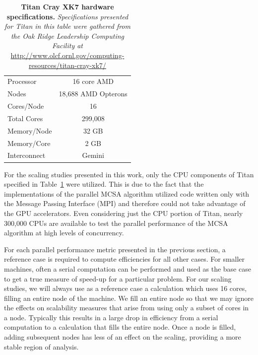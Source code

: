 \begin{table}[h!]
  \begin{center}
    \begin{tabular}{lc}\hline\hline
      Processor & 16 core AMD \\
      Nodes & 18,688 AMD Opterons \\
      Cores/Node & 16 \\
      Total Cores & 299,008 \\
      Memory/Node & 32 GB \\
      Memory/Core & 2 GB \\
      Interconnect & Gemini \\
      \hline\hline
    \end{tabular}
  \end{center}
  \caption{\textbf{Titan Cray XK7 hardware specifications.}
    \textit{Specifications presented for Titan in this table were
      gathered from the Oak Ridge Leadership Computing Facility at}
    \url{http://www.olcf.ornl.gov/computing-resources/titan-cray-xk7/}}
  \label{tab:titan_hardware}
\end{table}

For the scaling studies presented in this work, only the CPU
components of Titan specified in Table~\ref{tab:titan_hardware} were
utilized. This is due to the fact that the implementations of the
parallel MCSA algorithm utilized code written only with the Message
Passing Interface (MPI) and therefore could not take advantage of the
GPU accelerators. Even considering just the CPU portion of Titan,
nearly 300,000 CPUs are available to test the parallel performance of
the MCSA algorithm at high levels of concurrency.

For each parallel performance metric presented in the previous
section, a reference case is required to compute efficiencies for all
other cases. For smaller machines, often a serial computation can be
performed and used as the base case to get a true measure of speed-up
for a particular problem. For our scaling studies, we will always use
as a reference case a calculation which uses 16 cores, filling an
entire node of the machine. We fill an entire node so that we may
ignore the effects on scalability measures that arise from using only
a subset of cores in a node. Typically this results in a large drop in
efficiency from a serial computation to a calculation that fills the
entire node. Once a node is filled, adding subsequent nodes has less
of an effect on the scaling, providing a more stable region of
analysis.

